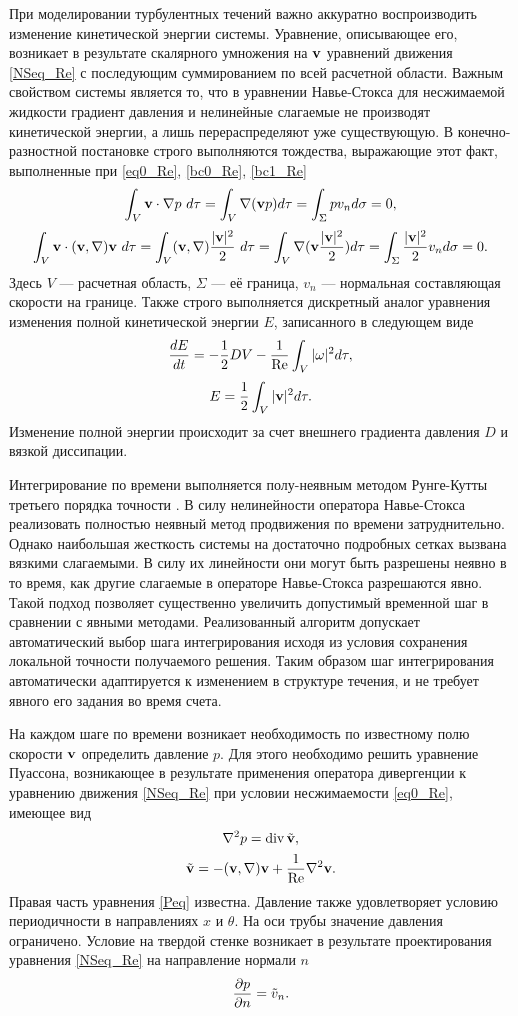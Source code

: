 При моделировании турбулентных течений важно аккуратно воспроизводить изменение кинетической энергии системы. Уравнение, описывающее его, возникает в результате скалярного умножения на $\mathbf{v}$ уравнений движения \eqref{NSeq_Re} с последующим суммированием по всей расчетной области. Важным свойством системы является то, что в уравнении Навье-Стокса для несжимаемой жидкости градиент давления и нелинейные слагаемые не производят кинетической энергии, а лишь перераспределяют уже существующую. В конечно-разностной постановке строго выполняются тождества, выражающие этот факт, выполненные при \eqref{eq0_Re}, \eqref{bc0_Re}, \eqref{bc1_Re}
$$
\int_V \mathbf{v} \cdot \nabla p\ d\tau= \int_V \nabla (\mathbf{v} p) d\tau = \int_{\Sigma} p v_n d\sigma = 0, 
$$
$$
\int_V \mathbf{v} \cdot (\mathbf{v}, \nabla) \mathbf{v}\ d\tau = \int_V (\mathbf{v}, \nabla)\frac{|\mathbf{v}|^2}{2}\ d\tau = \int_V \nabla (\mathbf{v} \frac{|\mathbf{v}|^2}{2}) d\tau = \int_{\Sigma} \frac{|\mathbf{v}|^2}{2} v_n d\sigma = 0.
$$
Здесь $V$ --- расчетная область, $\Sigma$ --- её граница, $v_n$ --- нормальная составляющая скорости на границе. Также строго выполняется дискретный аналог уравнения изменения полной кинетической энергии $E$, записанного в следующем виде
\begin{equation} \label{Eeq}
\frac{d E}{d t} = - \frac{1}{2}DV - \frac{1}{\operatorname{Re}} \int_{V} |\omega|^2 d\tau,
\end{equation}
$$
E = \frac{1}{2}\int_{V} |\mathbf{v}|^2 d\tau.
$$
Изменение полной энергии происходит за счет внешнего градиента давления $D$ и вязкой диссипации. 

Интегрирование по времени выполняется полу-неявным методом Рунге-Кутты третьего порядка точности \cite{Nikitin2006Third}. В силу нелинейности оператора Навье-Стокса реализовать полностью неявный метод продвижения по времени затруднительно. Однако наибольшая жесткость системы на достаточно подробных сетках вызвана вязкими слагаемыми. В силу их линейности они могут быть разрешены неявно в то время, как другие слагаемые в операторе Навье-Стокса разрешаются явно. Такой подход позволяет существенно увеличить допустимый временной шаг в сравнении с явными методами. Реализованный алгоритм допускает автоматический выбор шага интегрирования исходя из условия сохранения локальной точности получаемого решения. Таким образом шаг интегрирования автоматически адаптируется к изменением в структуре течения, и не требует явного его задания во время счета. 


На каждом шаге по времени возникает необходимость по известному полю скорости $\mathbf{v}$ определить давление $p$. Для этого необходимо решить уравнение Пуассона, возникающее в результате применения оператора дивергенции к уравнению движения \eqref{NSeq_Re} при условии несжимаемости \eqref{eq0_Re}, имеющее вид
\begin{equation}\label{Peq}
\nabla^2 p = \operatorname{div} \tilde {\mathbf{v}},
\end{equation}
$$
\tilde {\mathbf{v}} = - (\mathbf{v},\nabla)\mathbf{v} + \frac{1}{\operatorname{Re}}\nabla^2 \mathbf{v}. 
$$
Правая часть уравнения \eqref{Peq} известна. Давление также удовлетворяет условию периодичности в направлениях $x$ и $\theta$. На оси трубы значение давления ограничено. Условие на твердой стенке возникает в результате проектирования уравнения \eqref{NSeq_Re} на направление нормали $n$
$$
\frac{\partial p}{\partial n} = \tilde v_n.
$$


